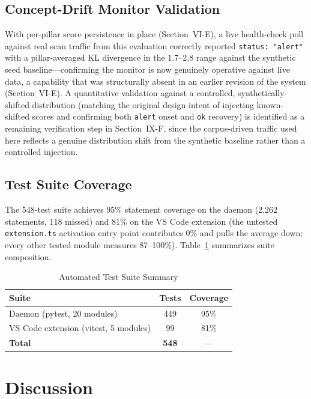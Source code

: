 \documentclass[journal]{IEEEtran}
\begin{document}
\subsection{Concept-Drift Monitor Validation}
With per-pillar score persistence in place (Section~VI-E), a live health-check poll against real scan
traffic from this evaluation correctly reported \texttt{status: "alert"} with a pillar-averaged KL divergence
in the 1.7--2.8 range against the synthetic seed baseline---confirming the monitor is now genuinely
operative against live data, a capability that was structurally absent in an earlier revision of the system
(Section~VI-E). A quantitative validation against a controlled, synthetically-shifted distribution (matching
the original design intent of injecting known-shifted scores and confirming both \texttt{alert} onset and
\texttt{ok} recovery) is identified as a remaining verification step in Section~IX-F, since the corpus-driven
traffic used here reflects a genuine distribution shift from the synthetic baseline rather than a controlled
injection.

\subsection{Test Suite Coverage}
The 548-test suite achieves 95\% statement coverage on the daemon (2,262 statements, 118 missed) and 81\%
on the VS Code extension (the untested \texttt{extension.ts} activation entry point contributes 0\% and pulls
the average down; every other tested module measures 87--100\%). Table~\ref{tab:tests} summarizes suite
composition.

\begin{table}[t]
\caption{Automated Test Suite Summary}
\label{tab:tests}
\centering
\begin{tabular}{@{}lcc@{}}
\toprule
\textbf{Suite} & \textbf{Tests} & \textbf{Coverage} \\
\midrule
Daemon (pytest, 20 modules)        & 449 & 95\% \\
VS Code extension (vitest, 5 modules) & 99  & 81\% \\
\midrule
\textbf{Total}                     & \textbf{548} & --- \\
\bottomrule
\end{tabular}
\end{table}

\section{Discussion}
\end{document}
